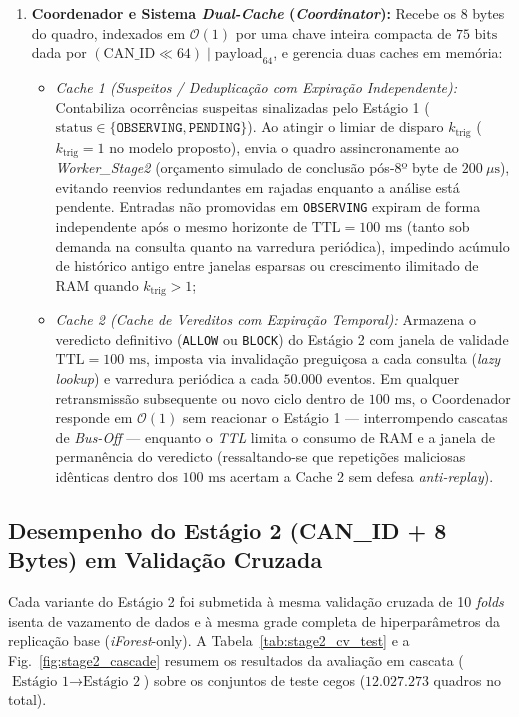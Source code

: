 \documentclass[conference]{IEEEtran}
\begin{document}
\begin{enumerate}
    \item \textbf{Coordenador e Sistema \textit{Dual-Cache} (\textit{Coordinator}):} Recebe os 8 bytes do quadro, indexados em $\mathcal{O}(1)$ por uma chave inteira compacta de $75\text{ bits}$ dada por $(\text{CAN\_ID} \ll 64) \mid \text{payload}_{64}$, e gerencia duas caches em memória:
    \begin{itemize}
        \item \textit{Cache 1 (Suspeitos / Deduplicação com Expiração Independente):} Contabiliza ocorrências suspeitas sinalizadas pelo Estágio 1 ($\text{status} \in \{\texttt{OBSERVING}, \texttt{PENDING}\}$). Ao atingir o limiar de disparo $k_{\text{trig}}$ ($k_{\text{trig}}=1$ no modelo proposto), envia o quadro assincronamente ao \textit{Worker\_Stage2} (orçamento simulado de conclusão pós-8º byte de $200~\mu\text{s}$), evitando reenvios redundantes em rajadas enquanto a análise está pendente. Entradas não promovidas em \texttt{OBSERVING} expiram de forma independente após o mesmo horizonte de $\text{TTL}=100\text{ ms}$ (tanto sob demanda na consulta quanto na varredura periódica), impedindo acúmulo de histórico antigo entre janelas esparsas ou crescimento ilimitado de RAM quando $k_{\text{trig}} > 1$;
        \item \textit{Cache 2 (Cache de Vereditos com Expiração Temporal):} Armazena o veredicto definitivo (\texttt{ALLOW} ou \texttt{BLOCK}) do Estágio 2 com janela de validade $\text{TTL} = 100\text{ ms}$, imposta via invalidação preguiçosa a cada consulta (\textit{lazy lookup}) e varredura periódica a cada $50.000$ eventos. Em qualquer retransmissão subsequente ou novo ciclo dentro de $100\text{ ms}$, o Coordenador responde em $\mathcal{O}(1)$ sem reacionar o Estágio 1 — interrompendo cascatas de \textit{Bus-Off} — enquanto o \textit{TTL} limita o consumo de RAM e a janela de permanência do veredicto (ressaltando-se que repetições maliciosas idênticas dentro dos $100\text{ ms}$ acertam a Cache 2 sem defesa \textit{anti-replay}).
    \end{itemize}
\end{enumerate}

\subsection{Desempenho do Estágio 2 (CAN\_ID + 8 Bytes) em Validação Cruzada}
Cada variante do Estágio 2 foi submetida à mesma validação cruzada de 10 \textit{folds} isenta de vazamento de dados e à mesma grade completa de hiperparâmetros da replicação base (\textit{iForest}-only). A Tabela~\ref{tab:stage2_cv_test} e a Fig.~\ref{fig:stage2_cascade} resumem os resultados da avaliação em cascata ($\text{Estágio 1} \rightarrow \text{Estágio 2}$) sobre os conjuntos de teste cegos ($12.027.273$ quadros no total).
\end{document}
